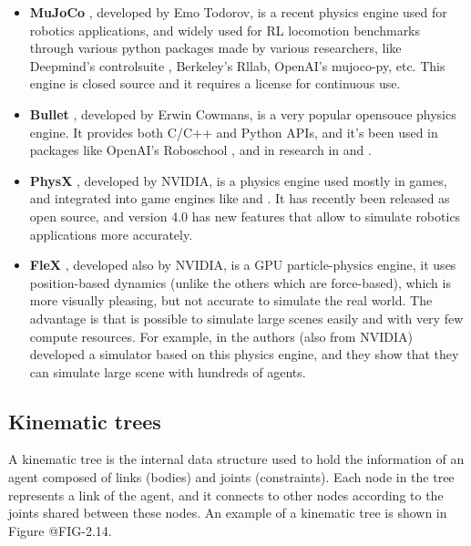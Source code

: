 \begin{itemize}
    \item \textbf{MuJoCo} \citep{MuJoCo}, developed by Emo Todorov, is a recent physics engine
          used for robotics applications, and widely used for RL locomotion benchmarks through
          various python packages made by various researchers, like Deepmind's controlsuite \citep{Controlsuite},
          Berkeley's Rllab, OpenAI's mujoco-py, etc. This engine is closed source and it
          requires a license for continuous use.

    \item \textbf{Bullet} \citep{Bullet}, developed by Erwin Cowmans, is a very popular opensouce
          physics engine. It provides both C/C++ and Python APIs, and it's been used in packages
          like OpenAI's Roboschool \citep{Roboschool}, and in research in \cite{DeepTerrainRL} and \cite{DeepMimic}.

    \item \textbf{PhysX} \citep{PhysX}, developed by NVIDIA, is a physics engine used
          mostly in games, and integrated into game engines like \citeauthor{Unity} and \citeauthor{Unreal}.
          It has recently been released as open source, and version 4.0 has new features
          that allow to simulate robotics applications more accurately.

    \item \textbf{FleX} \citep{FleX}, developed also by NVIDIA, is a GPU particle-physics engine,
          it uses position-based dynamics (unlike the others which are force-based), which is
          more visually pleasing, but not accurate to simulate the real world. The advantage is
          that is possible to simulate large scenes easily and with very few compute resources.
          For example, in \cite{GpuSim} the authors (also from NVIDIA) developed a simulator based on
          this physics engine, and they show that they can simulate large scene with hundreds of
          agents.
\end{itemize}

\subsection{Kinematic trees}

A kinematic tree is the internal data structure used to hold the information of
an agent composed of links (bodies) and joints (constraints). Each node in the 
tree represents a link of the agent, and it connects to other nodes according to
the joints shared between these nodes. An example of a kinematic tree is shown in
Figure @FIG-2.14. 

